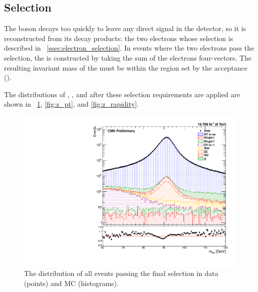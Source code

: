 \subsection{\Z Selection}

The \Z boson decays too quickly to leave any direct signal in the detector, so
it is reconstructed from its decay products: the two electrons whose selection
is described in \SEC~\ref{ssec:electron_selection}. In events where the two
electrons pass the selection, the \Z is constructed by taking the sum of the
electrons four-vectors. The resulting invariant mass of the \Z must be within
the region set by the acceptance (\MassRange).

The distributions of \mee, \Z \pt, and \Z \rapidity after these selection
requirements are applied are shown in \FIGS~\ref{fig:z_mass}, \ref{fig:z_pt},
and \ref{fig:z_rapidity}.

\begin{figure}[tb]
    \centering
    \includegraphics[width=\textwidth]{figures/z_mass_fine.pdf}
    \caption{
        The \mee distribution of all events passing the final selection in data
        (points) and MC (histograms).
    }
    \label{fig:z_mass}
\end{figure}

